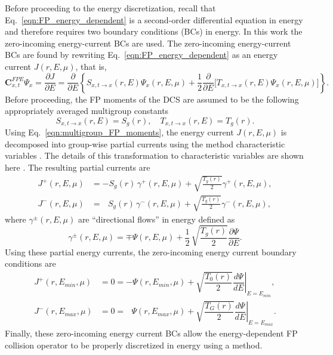 \documentclass[../main.tex]{subfiles}
\begin{document}
Before proceeding to the \dG energy discretization, recall that Eq.~\eqref{eqn:FP_energy_dependent} is a second-order differential equation in energy and therefore requires two boundary conditions (BCs) in energy. In this work the zero-incoming energy-current BCs are used. The zero-incoming energy-current BCs are found by rewriting Eq.~\eqref{eqn:FP_energy_dependent} as an energy current $J(r,E,\mu)$, that is,
\begin{equation}
    \boldsymbol{C}_{x,t}^{FPE} \Psi_x = \dfrac{\partial J}{\partial E} = \dfrac{\partial}{\partial E} \left\lbrace S_{x,t\rightarrow x}(r,E) \Psi_x(r,E,\mu)  + \dfrac{1}{2} \dfrac{\partial}{\partial E} \Big[ T_{x,t\rightarrow x}(r,E) \Psi_x(r,E,\mu) \Big] \right\rbrace.
\end{equation}
Before proceeding, the FP moments of the DCS are assumed to be the following appropriately averaged multigroup constants
\begin{equation} \label{eqn:multigroup_FP_moments}
    S_{x,t\rightarrow x}(r,E) = S_g(r), \quad T_{x,t\rightarrow x}(r,E) = T_g(r).
\end{equation}
Using Eq.~\eqref{eqn:multigroup_FP_moments}, the energy current $J(r,E,\mu)$ is decomposed into group-wise partial currents using the method characteristic variables \cite{Warsa-2002}. The details of this transformation to characteristic variables are shown here \cite{Beling-2021}. The resulting partial currents are
\begin{subequations}
    \begin{align}
        J^+(r,E,\mu) &= -S_g(r) \, \gamma^+(r,E,\mu) + \sqrt{\frac{T_g(r)}{2}} \gamma^+(r,E,\mu), \\
        J^-(r,E,\mu) &=  \,\,\,\,S_g(r) \, \gamma^-(r,E,\mu) + \sqrt{\frac{T_g(r)}{2}} \gamma^-(r,E,\mu),
    \end{align}
\end{subequations}
where $\gamma^{\pm}(r,E,\mu)$ are ``directional flows'' in energy defined as
\begin{equation}
    \gamma^{\pm}(r,E,\mu) = \mp \Psi(r,E,\mu) + \dfrac{1}{2} \, \sqrt{\frac{T_g(r)}{2}} \dfrac{\partial \Psi}{\partial E}.
\end{equation}
Using these partial energy currents, the zero-incoming energy current boundary conditions are
\begin{subequations} \label{eqn:Fokker-Planck-BCS}
    \begin{align}
        J^+(r,E_{min},\mu) &= 0 = - \Psi(r,E_{min},\mu) + \sqrt{\dfrac{T_{0}(r)}{2}} \left.\dfrac{d \Psi}{dE}\right|_{E=E_{min}}, \\
        J^-(r,E_{max},\mu) &= 0 = \,\,\,\, \Psi(r,E_{max},\mu) + \sqrt{\dfrac{T_G(r)}{2}} \left.\dfrac{d \Psi}{dE}\right|_{E=E_{max}}.
    \end{align}
\end{subequations}
Finally, these zero-incoming energy current BCs allow the energy-dependent FP collision operator to be properly discretized in energy using a \dG method. 
\end{document}
